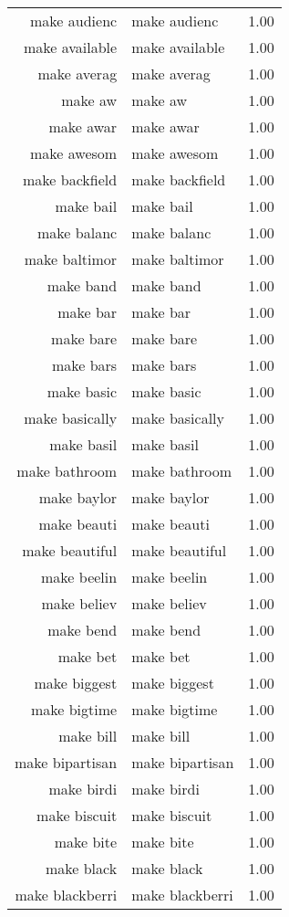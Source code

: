 \begin{table}[ht]
\begin{tabular}{rlr}
  make audienc & make audienc & 1.00 \\ 
  make available & make available & 1.00 \\ 
  make averag & make averag & 1.00 \\ 
  make aw & make aw & 1.00 \\ 
  make awar & make awar & 1.00 \\ 
  make awesom & make awesom & 1.00 \\ 
  make backfield & make backfield & 1.00 \\ 
  make bail & make bail & 1.00 \\ 
  make balanc & make balanc & 1.00 \\ 
  make baltimor & make baltimor & 1.00 \\ 
  make band & make band & 1.00 \\ 
  make bar & make bar & 1.00 \\ 
  make bare & make bare & 1.00 \\ 
  make bars & make bars & 1.00 \\ 
  make basic & make basic & 1.00 \\ 
  make basically & make basically & 1.00 \\ 
  make basil & make basil & 1.00 \\ 
  make bathroom & make bathroom & 1.00 \\ 
  make baylor & make baylor & 1.00 \\ 
  make beauti & make beauti & 1.00 \\ 
  make beautiful & make beautiful & 1.00 \\ 
  make beelin & make beelin & 1.00 \\ 
  make believ & make believ & 1.00 \\ 
  make bend & make bend & 1.00 \\ 
  make bet & make bet & 1.00 \\ 
  make biggest & make biggest & 1.00 \\ 
  make bigtime & make bigtime & 1.00 \\ 
  make bill & make bill & 1.00 \\ 
  make bipartisan & make bipartisan & 1.00 \\ 
  make birdi & make birdi & 1.00 \\ 
  make biscuit & make biscuit & 1.00 \\ 
  make bite & make bite & 1.00 \\ 
  make black & make black & 1.00 \\ 
  make blackberri & make blackberri & 1.00 \\ 

\end{tabular}
\end{table}
